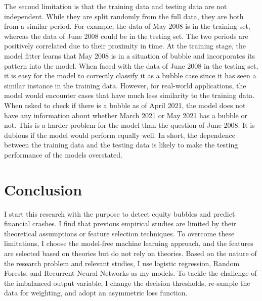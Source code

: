 \documentclass[12pt, man, a4paper, floatsintext]{apa7}
\begin{document}
The second limitation is that the training data and testing data are not independent. While they are split randomly from the full data, they are both from a similar period. For example, the data of May 2008 is in the training set, whereas the data of June 2008 could be in the testing set. The two periods are positively correlated due to their proximity in time. At the training stage, the model fitter learns that May 2008 is in a situation of bubble and incorporates its pattern into the model. When faced with the data of June 2008 in the testing set, it is easy for the model to correctly classify it as a bubble case since it has seen a similar instance in the training data. However, for real-world applications, the model would encounter cases that have much less similarity to the training data. When asked to check if there is a bubble as of April 2021, the model does not have any information about whether March 2021 or May 2021 has a bubble or not. This is a harder problem for the model than the question of June 2008. It is dubious if the model would perform equally well. In short, the dependence between the training data and the testing data is likely to make the testing performance of the models overstated.


    \section{Conclusion}

I start this research with the purpose to detect equity bubbles and predict financial crashes. I find that previous empirical studies are limited by their theoretical assumptions or feature selection techniques. To overcome these limitations, I choose the model-free machine learning approach, and the features are selected based on theories but do not rely on theories. Based on the nature of the research problem and relevant studies, I use logistic regression, Random Forests, and Recurrent Neural Networks as my models. To tackle the challenge of the imbalanced output variable, I change the decision thresholds, re-sample the data for weighting, and adopt an asymmetric loss function.
\end{document}
